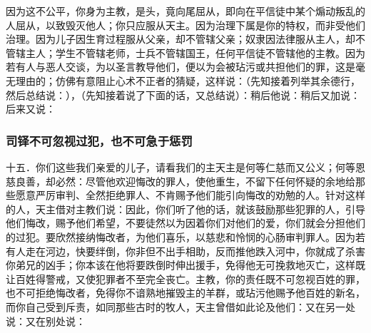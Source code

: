 因为这不公平，你身为主教，是头，竟向尾屈从，即向在平信徒中某个煽动叛乱的人屈从，以致毁灭他人；你只应服从天主。因为治理下属是你的特权，而非受他们治理。因为儿子因生育过程服从父亲，却不管辖父亲；奴隶因法律服从主人，却不管辖主人；学生不管辖老师，士兵不管辖国王，任何平信徒不管辖他的主教。因为若有人与恶人交谈，为以圣言教导他们，便以为会被玷污或共担他们的罪，这是毫无理由的；仿佛有意阻止心术不正者的猜疑，这样说：（先知接着列举其余德行，然后总结说：），（先知接着说了下面的话，又总结说）：稍后他说：稍后又加说：后来又说：\par


\subsubsection{司铎不可忽视过犯，也不可急于惩罚}

十五．你们这些我们亲爱的儿子，请看我们的主天主是何等仁慈而又公义；何等恩慈良善，却必然：尽管他欢迎悔改的罪人，使他重生，不留下任何怀疑的余地给那些愿意严厉审判、全然拒绝罪人、不肯赐予他们能引向悔改的劝勉的人。针对这样的人，天主借对主教们说：因此，你们听了他的话，就该鼓励那些犯罪的人，引导他们悔改，赐予他们希望，不要徒然以为因着你们对他们的爱，你们就会分担他们的过犯。要欣然接纳悔改者，为他们喜乐，以慈悲和怜悯的心肠审判罪人。因为若有人走在河边，快要绊倒，你非但不出手相助，反而推他跌入河中，你就成了杀害你弟兄的凶手；你本该在他将要跌倒时伸出援手，免得他无可挽救地灭亡，这样既让百姓得警戒，又使犯罪者不至完全丧亡。主教，你的责任既不可忽视百姓的罪，也不可拒绝悔改者，免得你不谙熟地摧毁主的羊群，或玷污他赐予他百姓的新名，而你自己受到斥责，如同那些古时的牧人，天主曾借如此论及他们：又在另一处说：又在别处说：\par

